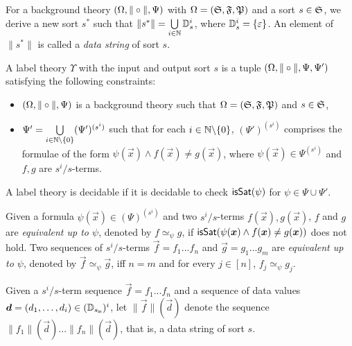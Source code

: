 For a background theory $(\Omega, \| \circ \|, \Psi)$ with $\Omega=({\mathfrak{S}}, {\mathfrak{F}}, {\mathfrak{P}})$ and a sort $s \in {\mathfrak{S}}$, we derive a new sort $s^*$ such that $\|s^* \| = \bigcup \limits_{i \in \mathbb{N}}\mathbb{D}_s^i$, where $\mathbb{D}^i_s = \{\varepsilon\}$. An element of $\|s^* \|$ is called a \emph{data string} of sort $s$.

\begin{definition}
A label theory  $\Upsilon$ with the input and output sort $s$ is a tuple $(\Omega, \| \circ \|, \Psi, \Psi')$ satisfying the following constraints:
\begin{itemize}
\item $(\Omega, \| \circ \|, \Psi)$ is a background theory such that $\Omega = ({\mathfrak{S}}, {\mathfrak{F}}, {\mathfrak{P}})$ and $s  \in {\mathfrak{S}}$,
%
\item $\Psi' = \bigcup \limits_{i \in \mathbb{N} \backslash \{0\}} (\Psi')^{(s^i)}$ such that for each $i \in \mathbb{N} \backslash \{0\}$, $ (\Psi')^{(s^i)}$ comprises the formulae of the form $\psi(\vec{x}) \wedge f(\vec{x}) \neq g(\vec{x})$, where $\psi(\vec{x}) \in \Psi^{(s^i)}$ and $f, g $ are $s^i/s$-terms.
\end{itemize}
A label theory is decidable if it is decidable to check $\mathsf{isSat}(\psi)$ for $\psi \in \Psi \cup \Psi'$.
\end{definition}

Given a formula $\psi(\vec{x}) \in (\Psi)^{(s^i)}$ and two $s^i /s$-terms $f(\vec{x}), g(\vec{x})$,
$f$ and $g$ are \emph{equivalent up to $\psi$}, denoted by $f \simeq_\psi g$, if
 $\issat(\psi(\vec{x}) \wedge f(\vec{x}) \neq g(\vec{x}))$ does not hold.
Two sequences of $s^i/ s$-terms $\vec{f}=f_1...f_n$ and $\vec{g}=g_1...g_m$ are \emph{equivalent up to $\psi$}, denoted by $\vec{f}\simeq_\psi \vec{g}$,
iff $n=m$ and for every $j \in [n]$, $f_j \simeq_\psi g_j$.

Given a $s^i/ s$-term sequence $\vec{f}=f_1...f_n$ and a sequence of data values $\vec{d} = (d_1, \dots, d_i) \in (\data_{s_{\sf in}})^i$,
let $\|\vec{f}\|(\vec{d})$ denote the sequence $\|f_1\|(\vec{d})...\|f_n\|(\vec{d})$, that is, a data string of sort $s$.

